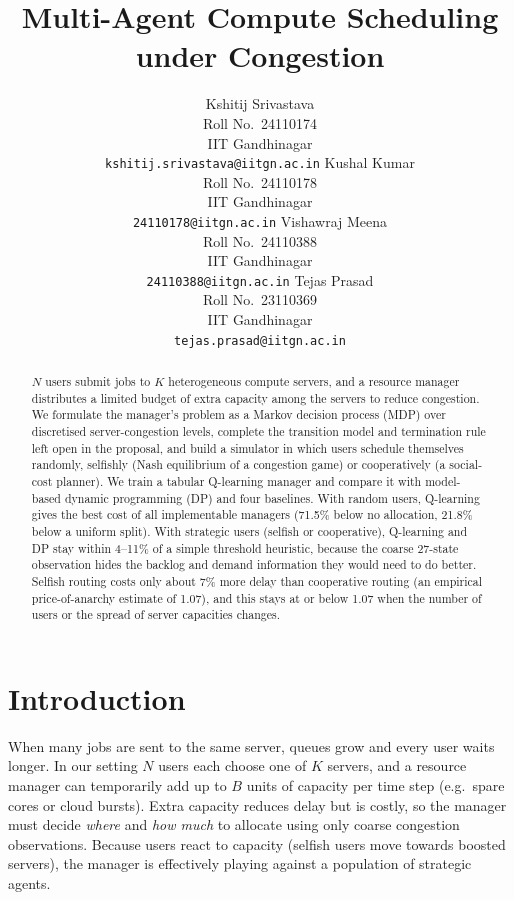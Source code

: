 \documentclass{article}
\title{Multi-Agent Compute Scheduling under Congestion}
\author{Kshitij Srivastava\\ Roll No.\ 24110174\\ IIT Gandhinagar\\ \texttt{kshitij.srivastava@iitgn.ac.in}
\And Kushal Kumar\\ Roll No.\ 24110178\\ IIT Gandhinagar\\ \texttt{24110178@iitgn.ac.in}
\AND Vishawraj Meena\\ Roll No.\ 24110388\\ IIT Gandhinagar\\ \texttt{24110388@iitgn.ac.in}
\And Tejas Prasad\\ Roll No.\ 23110369\\ IIT Gandhinagar\\ \texttt{tejas.prasad@iitgn.ac.in}}
\date{}
\begin{document}
\maketitle

\begin{abstract}
$N$ users submit jobs to $K$ heterogeneous compute servers, and a resource manager
distributes a limited budget of extra capacity among the servers to reduce congestion.
We formulate the manager's problem as a Markov decision process (MDP) over discretised
server-congestion levels, complete the transition model and termination rule left open
in the proposal, and build a simulator in which users schedule themselves randomly,
selfishly (Nash equilibrium of a congestion game) or cooperatively (a social-cost planner).
We train a tabular Q-learning manager and compare it with model-based dynamic
programming (DP) and four baselines. With random users, Q-learning gives the best cost of all implementable
managers (71.5\% below no allocation, 21.8\% below a uniform split). With strategic users
(selfish or cooperative), Q-learning and DP stay within 4--11\% of a simple threshold
heuristic, because the coarse 27-state observation hides the backlog and demand
information they would need to do better. Selfish routing costs only about 7\% more delay
than cooperative routing (an empirical price-of-anarchy estimate of 1.07), and this stays at or below 1.07
when the number of users or the spread of server capacities changes.
\end{abstract}


\section{Introduction}
When many jobs are sent to the same server, queues grow and every user waits longer.
In our setting $N$ users each choose one of $K$ servers, and a resource manager can
temporarily add up to $B$ units of capacity per time step (e.g.\ spare cores or
cloud bursts). Extra capacity reduces delay but is costly, so the manager must decide
\emph{where} and \emph{how much} to allocate using only coarse congestion observations.
Because users react to capacity (selfish users move towards boosted servers), the
manager is effectively playing against a population of strategic agents.
\end{document}

